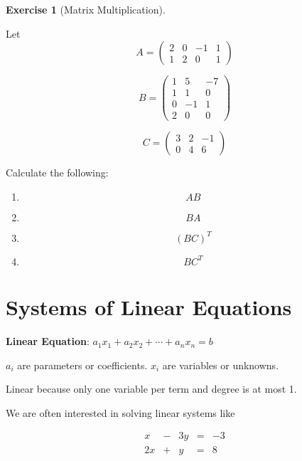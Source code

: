 \documentclass[
]{book}
\providecommand{\tightlist}{%
  \setlength{\itemsep}{0pt}\setlength{\parskip}{0pt}}
\theoremstyle{definition}
\theoremstyle{definition}
\theoremstyle{definition}
\newtheorem{exercise}{Exercise}[chapter]
\theoremstyle{remark}
\begin{document}
\begin{exercise}[Matrix Multiplication]
\protect\hypertarget{exr:matrixmulti1}{}{\label{exr:matrixmulti1} {} }

Let \[A =  \begin{pmatrix} 2&0&-1&1\\1&2&0&1 \end{pmatrix}\]

\[B = \begin{pmatrix} 1&5&-7\\1&1&0\\0&-1&1\\2&0&0\end{pmatrix} \]

\[C =  \begin{pmatrix} 3&2&-1\\0&4&6 \end{pmatrix}\]

Calculate the following:

\begin{enumerate}
\def\labelenumi{\arabic{enumi}.}
\tightlist
\item
  \[AB\]
\item
  \[BA\]
\item
  \[(BC)^T\]
\item
  \[BC^T\]
\end{enumerate}
\end{exercise}

\hypertarget{systems-of-linear-equations}{%
\section{Systems of Linear Equations}\label{systems-of-linear-equations}}

\textbf{Linear Equation}: \(a_1 x_1 + a_2 x_2 + \cdots + a_n x_n = b\)

\(a_i\) are parameters or coefficients. \(x_i\) are variables or unknowns.

Linear because only one variable per term and degree is at most 1.

We are often interested in solving linear systems like

\[\begin{matrix}
            x  & - & 3y & = & -3\\
            2x & + &  y & = &  8
            \end{matrix}\]

\end{document}
